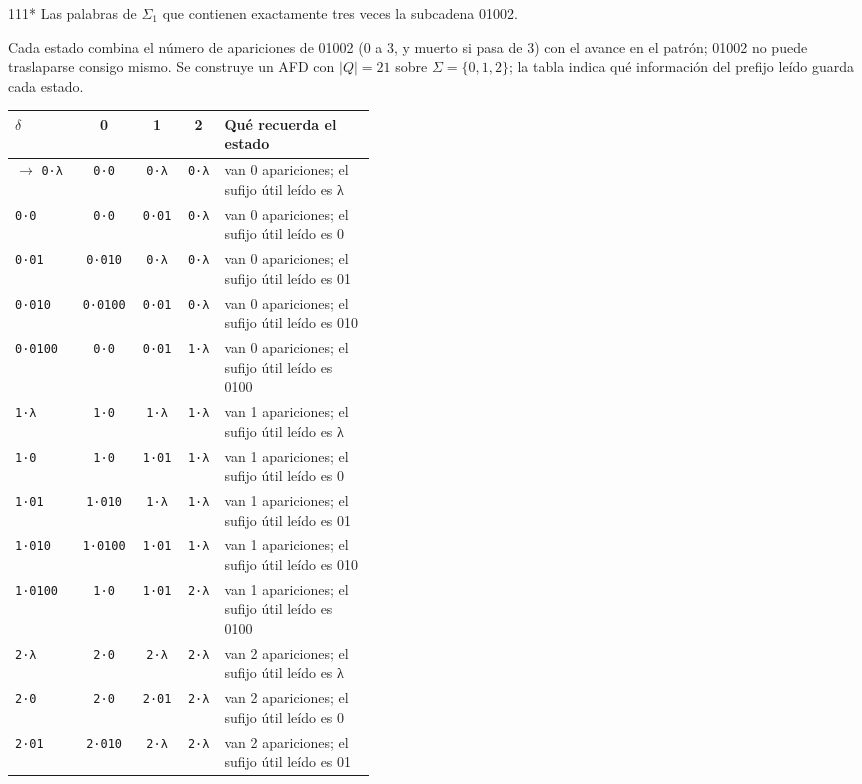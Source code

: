 \documentclass[11pt]{article}
\begin{document}
\begin{ejercicio}{111}{*}
Las palabras de $\Sigma_1$ que contienen exactamente tres veces la subcadena 01002.
\end{ejercicio}
\proc Cada estado combina el número de apariciones de 01002 (0 a 3, y muerto si pasa de 3) con el avance en el patrón; 01002 no puede traslaparse consigo mismo. Se construye un AFD con $|Q| = 21$ sobre $\Sigma = \{0, 1, 2\}$; la tabla indica qué información del prefijo leído guarda cada estado.
\begin{center}\small\begin{tabular}{lcccp{0.42\linewidth}}\toprule
$\delta$ & 0 & 1 & 2 & Qué recuerda el estado \\\midrule
$\to$ \texttt{0·λ} & \texttt{0·0} & \texttt{0·λ} & \texttt{0·λ} & van 0 apariciones; el sufijo útil leído es λ \\
 \texttt{0·0} & \texttt{0·0} & \texttt{0·01} & \texttt{0·λ} & van 0 apariciones; el sufijo útil leído es 0 \\
 \texttt{0·01} & \texttt{0·010} & \texttt{0·λ} & \texttt{0·λ} & van 0 apariciones; el sufijo útil leído es 01 \\
 \texttt{0·010} & \texttt{0·0100} & \texttt{0·01} & \texttt{0·λ} & van 0 apariciones; el sufijo útil leído es 010 \\
 \texttt{0·0100} & \texttt{0·0} & \texttt{0·01} & \texttt{1·λ} & van 0 apariciones; el sufijo útil leído es 0100 \\
 \texttt{1·λ} & \texttt{1·0} & \texttt{1·λ} & \texttt{1·λ} & van 1 apariciones; el sufijo útil leído es λ \\
 \texttt{1·0} & \texttt{1·0} & \texttt{1·01} & \texttt{1·λ} & van 1 apariciones; el sufijo útil leído es 0 \\
 \texttt{1·01} & \texttt{1·010} & \texttt{1·λ} & \texttt{1·λ} & van 1 apariciones; el sufijo útil leído es 01 \\
 \texttt{1·010} & \texttt{1·0100} & \texttt{1·01} & \texttt{1·λ} & van 1 apariciones; el sufijo útil leído es 010 \\
 \texttt{1·0100} & \texttt{1·0} & \texttt{1·01} & \texttt{2·λ} & van 1 apariciones; el sufijo útil leído es 0100 \\
 \texttt{2·λ} & \texttt{2·0} & \texttt{2·λ} & \texttt{2·λ} & van 2 apariciones; el sufijo útil leído es λ \\
 \texttt{2·0} & \texttt{2·0} & \texttt{2·01} & \texttt{2·λ} & van 2 apariciones; el sufijo útil leído es 0 \\
 \texttt{2·01} & \texttt{2·010} & \texttt{2·λ} & \texttt{2·λ} & van 2 apariciones; el sufijo útil leído es 01 \\

\end{tabular}
\end{center}
\end{document}

